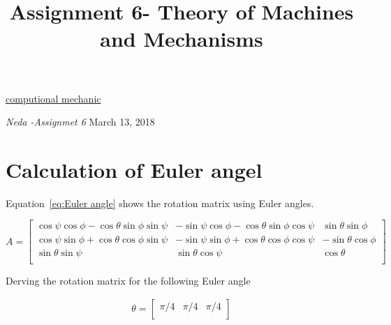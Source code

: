 \documentclass[letterpaper,10pt]{article} %
\date{}
\begin{document}
\title{\vspace{-1ex} \bfseries
Assignment 6- Theory of Machines and Mechanisms
\vspace{1ex}}
\url{computional mechanic}

{\fontsize{10}{12} \selectfont \color{imsd_gray}
               \noindent\textit{Neda -Assignmet 6}
               \hphantom{} \hfill March 13, 2018}
{\let\newpage\relax\maketitle\thispagestyle{empty}\vspace{-0.5em}}
\maketitle
\thispagestyle{empty}





\section{Calculation of Euler angel  }

Equation~\ref{eq:Euler angle} shows the rotation matrix using Euler angles. 



\begin{equation}
A= \begin{bmatrix}
\cos\psi \cos\phi-\cos\theta \sin\phi \sin\psi    &    -\sin\psi \cos\phi-\cos\theta \sin\phi \cos\psi  & \sin\theta \sin\phi\\
\cos\psi \sin\phi+\cos\theta \cos\phi \sin\psi    &  -\sin\psi \sin\phi+\cos\theta \cos\phi \cos\psi   &-\sin\theta \cos\phi\\
\sin\theta \sin\psi                                &        \sin\theta \cos\psi           &       \cos\theta\\	
\end{bmatrix}
\label{eq:Euler angle}
\end{equation}

Derving the rotation matrix for the following Euler angle  

\begin{eqnarray*}
	\theta= \begin{bmatrix}
		\pi/4   & \pi/4   &  \pi/4 \\		
	\end{bmatrix}
\end{eqnarray*}
\end{document}
